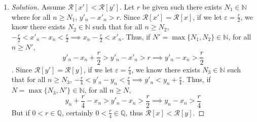 \documentclass{article}
\newcommand{\N}{{\mathbb N}}
\newcommand{\Q}{{\mathbb Q}}
\newcommand{\ep}{{\varepsilon}}
\newcommand{\SR}{{\mathcal R}}
\begin{document}
\begin{enumerate}
	\item \begin{proof}[Solution]\let\qed\relax
		Assume $\SR[x'] < \SR[y']$.
		Let $r$ be given such there exists $N_1 \in \N$ where for
		all $n \geq N_1$, $y'_n - x'_n > r$.
		Since $\SR[x'] = \SR[x]$,
		if we let $\ep = \frac{r}{2}$, we know there exists $N_2 \in \N$
		such that for all $n \geq N_2$, $-\frac{r}{2} < x'_n - x_n < \frac{r}{2}
		\implies x_n - \frac{r}{2} < x'_n$.
		Thus, if $N' = \max\{N_1,N_2\}\in\N$, for all $n \geq N'$,
		\[
			y'_n - x_n + \frac{r}{2} > y'_n - x'_n > r \implies
			y'_n - x_n > \frac{r}{2}
		\]
		.
		Since $\SR[y'] = \SR[y]$,
		if we let $\ep = \frac{r}{4}$, we know there exists $N_3 \in \N$
		such that for all $n \geq N_3$, $-\frac{r}{4} < y'_n - y_n < \frac{r}{4}
		\implies y'_n < y_n + \frac{r}{4}$.
		Thus, if $N = \max\{N_3,N'\}\in\N$, for all $n \geq N$,
		\[
			y_n + \frac{r}{4} - x_n > y'_n - x_n > \frac{r}{2} \implies
		y_n - x_n > \frac{r}{4}
		\]
		But if $0 < r \in \Q$, certainly $0 < \frac{r}{4} \in \Q$,
		thus $\SR[x] < \SR[y]$.


\end{proof}
\end{enumerate}
\end{document}
